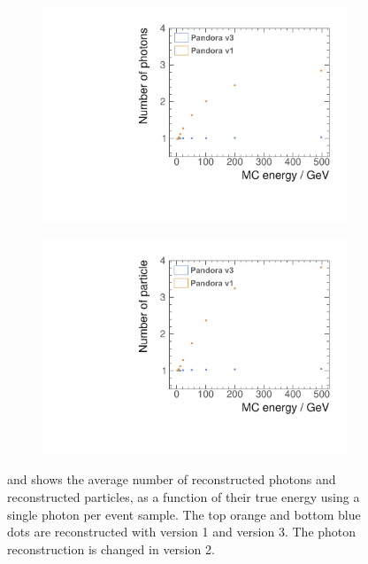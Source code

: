 \begin{figure}[tbph]
\centering
    \begin{subfigure}[b]{0.45\textwidth}
        \includegraphics[width=\textwidth]{photon/SingleN_pedit.pdf}
        \caption{}
        \label{fig:photonSingleN_p}
    \end{subfigure}
    \begin{subfigure}[b]{0.45\textwidth}
        \includegraphics[width=\textwidth]{photon/SingleN_alledit.pdf}
        \caption{}
        \label{fig:photonSingleN_all}
    \end{subfigure}
\caption[Average number of reconstructed photons and reconstructed particles, as a function of their true energy using single photon sample.]
{ and  shows the average number of reconstructed photons and reconstructed particles, as a function of their true energy using a single photon per event sample. The top orange and bottom blue dots are reconstructed with \pandora version 1 and version 3. The photon reconstruction is changed in \pandora version 2.}
\label{fig:photonSingleN}
\end{figure}


